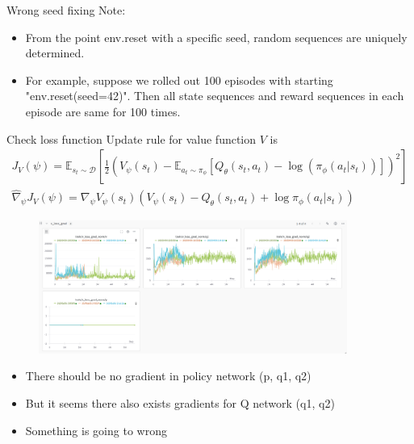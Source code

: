 \documentclass[8pt]{beamer}
\newcommand{\mbb}[1]{\mathbb{#1}}
\begin{document}
\begin{frame}{Wrong seed fixing}
    Note:
    \begin{itemize}
        \item From the point env.reset with a specific seed, random sequences are uniquely determined.
        \item For example, suppose we rolled out 100 episodes with starting "env.reset(seed=42)". Then all state sequences and reward sequences in each episode are same for 100 times.
    \end{itemize}
\end{frame}

\begin{frame}{Check loss function}
    Update rule for value function $V$ is
    \[
    \begin{gathered}
        J_V(\psi) = \mbb{E}_{s_t \sim \mathcal{D}} \left[ \frac{1}{2}\left(V_\psi (s_t) - \mbb{E}_{a_t \sim \pi_\phi} \left[Q_\theta (s_t, a_t) - \log{(\pi_\phi (a_t |s_t))}\right]\right)^2\right] \\
        \hat{\nabla}_\psi J_V(\psi) = \nabla_\psi V_\psi (s_t) \left(V_\psi (s_t) - Q_\theta (s_t, a_t) + \log{\pi_\phi (a_t|s_t)}\right)
    \end{gathered}
    \]

    \begin{figure}
        \centering
        \includegraphics[width=0.9\textwidth]{fig4.png}
    \end{figure}

    \begin{itemize}
        \item There should be no gradient in policy network (p, q1, q2)
        \item But it seems there also exists gradients for Q network (q1, q2)
        \item Something is going to wrong
    \end{itemize}
\end{frame}
\end{document}
